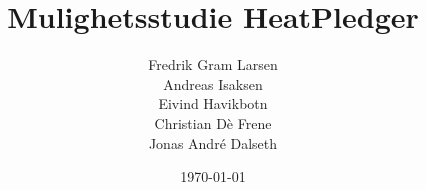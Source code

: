 \newcommand{\kopp}{Mulighetsstudie HeatPledger}
\newcommand{\mytitle}{\kopp}
\newcommand{\mygroupnumber}{59}
\newcommand{\myauthor}{Fredrik Gram Larsen\\Andreas Isaksen\\Eivind Havikbotn\\Christian Dè Frene\\Jonas André Dalseth}

\title{\mytitle}
\author{\myauthor}
\date{\today}

